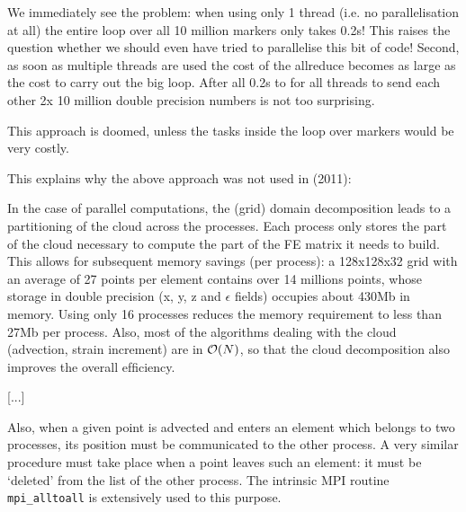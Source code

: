 We immediately see the problem: when using only 1 thread (i.e. no parallelisation 
at all) the entire loop over all 10 million markers only takes 0.2s! 
This raises the question whether we should even have tried to parallelise this 
bit of code! 
Second, as soon as multiple threads are used the cost of the allreduce becomes 
as large as the cost to carry out the big loop. After all 0.2s to for all threads 
to send each other 2x 10 million double precision numbers is not too surprising.

This approach is doomed, unless the tasks inside the loop over markers would be 
very costly.

This explains why the above approach was not used in \textcite{thie11} (2011):
\begin{displayquote}
{\color{darkgray} 
In the case of parallel computations, the (grid) domain decomposition leads 
to a partitioning of
the cloud across the processes. Each process only stores the part of
the cloud necessary to compute the part of the FE matrix it needs
to build. This allows for subsequent memory savings (per process):
a 128x128x32 grid with an average of 27 points per element
contains over 14 millions points, whose storage in double precision
(x, y, z and $\epsilon$ fields) occupies about 430Mb in memory. Using only
16 processes reduces the memory requirement to less than 27Mb
per process. Also, most of the algorithms dealing with the cloud
(advection, strain increment) are in ${\cal O}(N)$, so that the cloud decomposition 
also improves the overall efﬁciency.

[...]

Also, when a given
point is advected and enters an element which belongs to two processes, 
its position must be communicated to the other process. A
very similar procedure must take place when a point leaves such
an element: it must be ‘deleted’ from the list of the other process.
The intrinsic MPI routine \verb|mpi_alltoall| is extensively used to this
purpose.
}
\end{displayquote}






